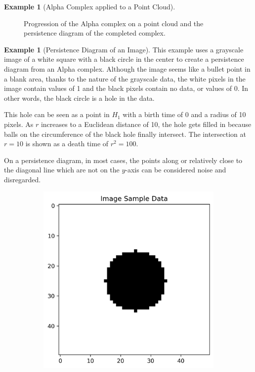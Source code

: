 \documentclass[ma]{uncgdissertationexp}
\theoremstyle{plain}
\theoremstyle{definition}
\newtheorem{example}[theorem]{Example}
\theoremstyle{remark}
\begin{document}
\begin{example}[Alpha Complex applied to a Point Cloud]
\begin{figure}[H]
    \caption{Progression of the Alpha complex on a point cloud and the persistence diagram of the completed complex.}
    \label{fig:point_cloud_alpha_complex}
\end{figure}
\end{example}

\newpage
\begin{example}[Persistence Diagram of an Image]
\par This example uses a grayscale image of a white square with a black circle in the center to create a persistence diagram from an Alpha complex. Although the image seems like a bullet point in a blank area, thanks to the nature of the grayscale data, the white pixels in the image contain values of 1 and the black pixels contain no data, or values of 0. In other words, the black circle is a hole in the data.
\par This hole can be seen as a point in $H_1$ with a birth time of 0 and a radius of 10 pixels. As $r$ increases to a Euclidean distance of 10, the hole gets filled in because balls on the circumference of the black hole finally intersect. The intersection at $r=10$ is shown as a death time of ${r}^2 = 100$.
\par On a persistence diagram, in most cases, the points along or relatively close to the diagonal line which are not on the $y$-axis can be considered noise and disregarded.
\begin{figure}[H]
    \centering
    \begin{subfigure}[b]{0.45\textwidth}
        \centering
        \includegraphics[width=\textwidth]{image_data_plot.png}

\end{subfigure}
\end{figure}
\end{example}
\end{document}

